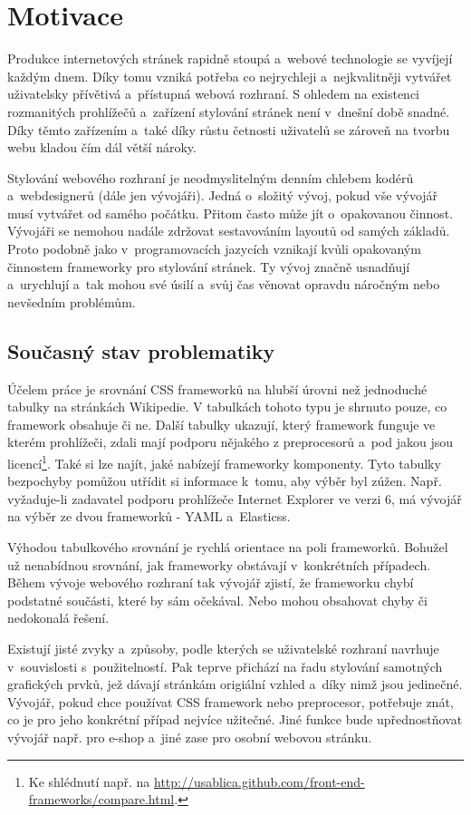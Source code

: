 \documentclass[thesis=B,czech]{FITthesis}[2012/06/26]
\begin{document}
\chapter{Motivace}
Produkce internetových stránek rapidně stoupá a~webové technologie se vyvíjejí každým dnem. Díky tomu vzniká potřeba co nejrychleji a~nejkvalitněji vytvářet uživatelsky přívětivá a~přístupná webová rozhraní. S ohledem na existenci rozmanitých prohlížečů a~zařízení stylování stránek není v~dnešní době snadné. Díky těmto zařízením a~také díky růstu četnosti uživatelů se zároveň na tvorbu webu kladou čím dál větší nároky.

Stylování webového rozhraní je neodmyslitelným denním chlebem kodérů a~webdesignerů (dále jen vývojáři). Jedná o~složitý vývoj, pokud vše vývojář musí vytvářet od samého počátku. Přitom často může jít o~opakovanou činnost. Vývojáři se nemohou nadále zdržovat sestavováním layoutů od samých základů. Proto podobně jako v~programovacích jazycích vznikají kvůli opakovaným činnostem frameworky pro stylování stránek. Ty vývoj značně usnadňují a~urychlují a~tak mohou své úsilí a~svůj čas věnovat opravdu náročným nebo nevšedním problémům.


\section{Současný stav problematiky}

Účelem práce je srovnání CSS frameworků na hlubší úrovni než jednoduché tabulky na stránkách Wikipedie. V tabulkách tohoto typu je shrnuto pouze, co framework obsahuje či ne. Další tabulky ukazují, který framework funguje ve kterém prohlížeči, zdali mají podporu nějakého z preprocesorů a~pod jakou jsou licencí\footnote{Ke shlédnutí např. na \url{http://usablica.github.com/front-end-frameworks/compare.html}.}. Také si lze najít, jaké nabízejí frameworky komponenty. Tyto tabulky bezpochyby pomůžou utřídit si informace k~tomu, aby výběr byl zúžen. Např. vyžaduje-li zadavatel podporu prohlížeče Internet Explorer ve verzi 6, má vývojář na výběr ze dvou frameworků - YAML a~Elasticss.

Výhodou tabulkového srovnání je rychlá orientace na poli frameworků. Bohužel už nenabídnou srovnání, jak frameworky obstávají v~konkrétních případech. Během vývoje webového rozhraní tak vývojář zjistí, že frameworku chybí podstatné součásti, které by sám očekával. Nebo mohou obsahovat chyby či nedokonalá řešení. 

Existují jisté zvyky a~způsoby, podle kterých se uživatelské rozhraní navrhuje v~souvislosti s~použitelností. Pak teprve přichází na řadu stylování samotných grafických prvků, jež dávají stránkám origiální vzhled a~díky nimž jsou jedinečné. Vývojář, pokud chce používat CSS framework nebo preprocesor, potřebuje znát, co je pro jeho konkrétní případ nejvíce užitečné. Jiné funkce bude upřednostňovat vývojář např. pro e-shop a~jiné zase pro osobní webovou stránku.
\end{document}
